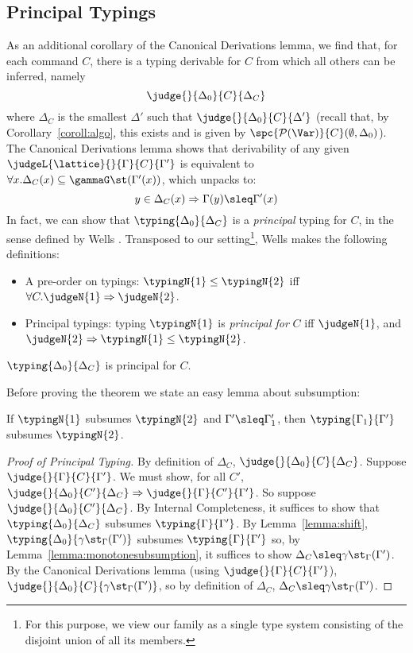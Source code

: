 \documentclass{sigplanconf}
\newcommand{\pset}{\mathcal{P}}
\begin{document}
\subsection{Principal Typings}\label{sect:principal}
As an additional corollary of the Canonical Derivations lemma, we find that, for each
command $C$, there is a typing derivable for
$C$ from which all others can be inferred, namely
\[
    \judge{}{\Delta_0}{C}{\Delta_C}
\]
where $\Delta_C$ is the smallest $\Delta'$ such that $\judge{}{\Delta_0}{C}{\Delta'}$
(recall that, by Corollary~\ref{coroll:algo}, this exists and is given by
$\spc{\pset(\Var)}{C}(\emptyset,\Delta_0)$).
The Canonical Derivations lemma shows that
derivability of any given
$\judgeL{\lattice}{}{\Gamma}{C}{\Gamma'}$ is equivalent
to $\forall x . \Delta_C(x) \subseteq \gammaG\st(\Gamma'(x))$, which unpacks to:
\begin{equation}
    y \in \Delta_C(x) => \Gamma(y) \sleq \Gamma'(x)
\end{equation}
In fact, we can show that $\typing{\Delta_0}{\Delta_C}$ is a \emph{principal} typing
for $C$, in the sense defined by Wells \cite{Wells:ICALP-2002}.
Transposed to our setting\footnote{For this purpose, we view our family as a single type system consisting of the disjoint
union of all its members.},
Wells makes the following definitions:
\begin{itemize}
\item A pre-order on typings: $\typingN{1} \leq \typingN{2}$ iff $\forall C . \judgeN{1} => \judgeN{2}$.
\item Principal typings: typing $\typingN{1}$ is \emph{principal for} $C$ iff $\judgeN{1}$, and
$\judgeN{2} => \typingN{1} \leq \typingN{2}$.
\end{itemize}
\begin{theorem}
$\typing{\Delta_0}{\Delta_C}$ is principal for $C$.
\end{theorem}
Before proving the theorem we state an easy lemma about subsumption:
\begin{lemma}\label{lemma:monotonesubsumption}
If $\typingN{1}$ subsumes $\typingN{2}$ and $\Gamma' \sleq \Gamma_1'$, then
$\typing{\Gamma_1}{\Gamma'}$ subsumes $\typingN{2}$.
\end{lemma}
\begin{proof}[Proof of Principal Typing]
By definition of $\Delta_C$, $\judge{}{\Delta_0}{C}{\Delta_C}$. Suppose
$\judge{}{\Gamma}{C}{\Gamma'}$.
We must show, for all $C'$, $\judge{}{\Delta_0}{C'}{\Delta_C} => \judge{}{\Gamma}{C'}{\Gamma'}$.
So suppose $\judge{}{\Delta_0}{C'}{\Delta_C}$. By Internal Completeness, it suffices to show
that $\typing{\Delta_0}{\Delta_C}$ subsumes $\typing{\Gamma}{\Gamma'}$.
By Lemma~\ref{lemma:shift},
$\typing{\Delta_0}{\gamma\st_\Gamma(\Gamma')}$
subsumes
$\typing{\Gamma}{\Gamma'}$ so, by Lemma~\ref{lemma:monotonesubsumption},
it suffices to show $\Delta_C \sleq \gamma\st_\Gamma(\Gamma')$.
By the Canonical Derivations lemma (using $\judge{}{\Gamma}{C}{\Gamma'}$),
$\judge{}{\Delta_0}{C}{\gamma\st_\Gamma(\Gamma')}$, so by definition of $\Delta_C$,
$\Delta_C \sleq \gamma\st_\Gamma(\Gamma')$.
\end{proof}
\end{document}
